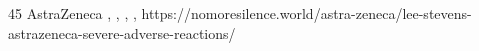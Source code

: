           {}
          {45}
          {AstraZeneca}
          {}
          {
            ,
            ,
            ,
            ,
          }
          {https://nomoresilence.world/astra-zeneca/lee-stevens-astrazeneca-severe-adverse-reactions/}

